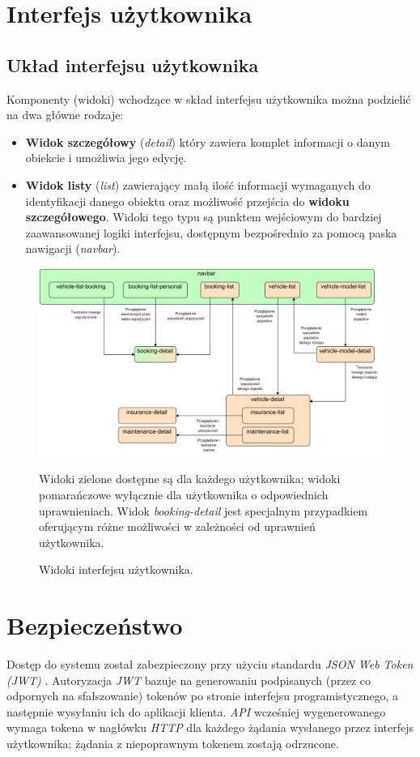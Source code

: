 \documentclass[eng,printmode,openany]{mgr}
\begin{document}
	
	\newpage
	
	
	
	\section{Interfejs użytkownika}
	\subsection{Układ interfejsu użytkownika}
	Komponenty (widoki) wchodzące w skład interfejsu użytkownika można podzielić na dwa główne rodzaje:
	\begin{itemize}
		\item \textbf{Widok szczegółowy} (\textit{detail}) który zawiera komplet informacji o danym obiekcie i umożliwia jego edycję.
		\item \textbf{Widok listy} (\textit{list}) zawierający małą ilość informacji wymaganych do identyfikacji danego obiektu oraz możliwość przejścia do \textbf{widoku szczegółowego}. Widoki tego typu są punktem wejściowym do bardziej zaawansowanej logiki interfejsu, dostępnym bezpośrednio za pomocą paska nawigacji (\textit{navbar}).
	\end{itemize}
	\begin{figure}[h]
		\centering
		\includegraphics[scale=0.62]{images/angular_views.png}
		\caption{Widoki interfejsu użytkownika.}
		\small 
		Widoki zielone dostępne są dla każdego użytkownika; widoki pomarańczowe wyłącznie dla użytkownika o odpowiednich uprawnieniach. Widok \textit{booking-detail} jest specjalnym przypadkiem oferującym różne możliwości w zależności od uprawnień użytkownika.
	\end{figure}
	
	\section{Bezpieczeństwo}
	Dostęp do systemu został zabezpieczony przy użyciu standardu \textit{JSON Web Token (JWT)} \cite{jwt}. Autoryzacja \textit{JWT} bazuje na generowaniu podpisanych (przez co odpornych na sfałszowanie) tokenów po stronie interfejsu programistycznego, a następnie wysyłaniu ich do aplikacji klienta. \textit{API} wcześniej wygenerowanego wymaga tokena w nagłówku \textit{HTTP} dla każdego żądania wysłanego przez interfejs użytkownika; żądania z niepoprawnym tokenem zostają odrzucone.
	
\end{document}
